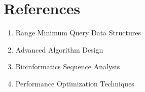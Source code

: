 \documentclass{article}
\begin{document}
\section{References}
\begin{enumerate}
    \item Range Minimum Query Data Structures
    \item Advanced Algorithm Design
    \item Bioinformatics Sequence Analysis
    \item Performance Optimization Techniques
\end{enumerate}
\end{document}
